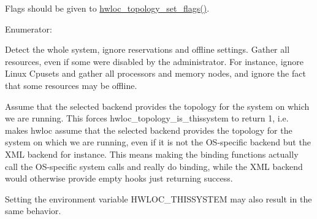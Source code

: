 Flags should be given to \hyperlink{a00044_ga6d11e53db143ac39c32cdb3912b71f99}{hwloc\_\-topology\_\-set\_\-flags()}. \begin{Desc}
\item[Enumerator: ]\par
\begin{description}
\item[{\em 
\hypertarget{a00044_ggada025d3ec20b4b420f8038d23d6e7bdea129b4fea1300be22bbaf0bb0958994c8}{
HWLOC\_\-TOPOLOGY\_\-FLAG\_\-WHOLE\_\-SYSTEM}
\label{a00044_ggada025d3ec20b4b420f8038d23d6e7bdea129b4fea1300be22bbaf0bb0958994c8}
}]Detect the whole system, ignore reservations and offline settings. Gather all resources, even if some were disabled by the administrator. For instance, ignore Linux Cpusets and gather all processors and memory nodes, and ignore the fact that some resources may be offline. \item[{\em 
\hypertarget{a00044_ggada025d3ec20b4b420f8038d23d6e7bdea6ecb6abc6a0bb75e81564f8bca85783b}{
HWLOC\_\-TOPOLOGY\_\-FLAG\_\-IS\_\-THISSYSTEM}
\label{a00044_ggada025d3ec20b4b420f8038d23d6e7bdea6ecb6abc6a0bb75e81564f8bca85783b}
}]Assume that the selected backend provides the topology for the system on which we are running. This forces hwloc\_\-topology\_\-is\_\-thissystem to return 1, i.e. makes hwloc assume that the selected backend provides the topology for the system on which we are running, even if it is not the OS-\/specific backend but the XML backend for instance. This means making the binding functions actually call the OS-\/specific system calls and really do binding, while the XML backend would otherwise provide empty hooks just returning success.

Setting the environment variable HWLOC\_\-THISSYSTEM may also result in the same behavior.


\end{description}
\end{Desc}
